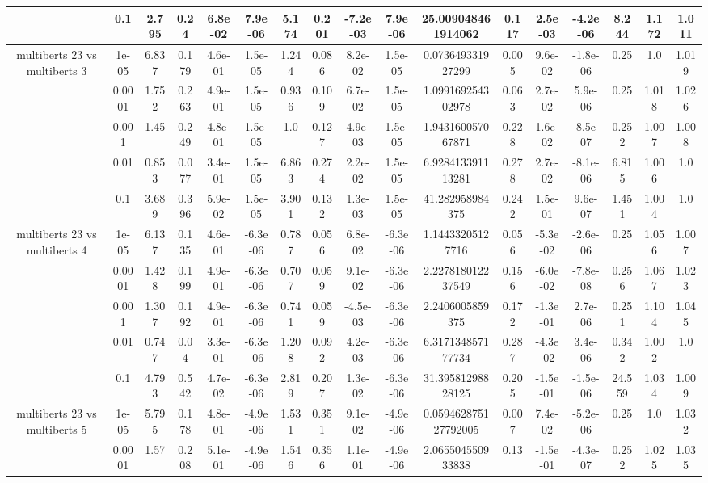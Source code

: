 \begin{tabular}{|c|c|c|c|c|c|c|c|c|c|c|c|c|c|c|c|c|}
 & 0.1 & 2.795 & 0.24 & 6.8e-02 & 7.9e-06 & 5.174 & 0.201 & -7.2e-03 & 7.9e-06 & 25.009048461914062 & 0.117 & 2.5e-03 & -4.2e-06 & 8.244 & 1.172 & 1.011 \\
\hline
\multirow{5}{*}{multiberts 23 vs multiberts 3} & 1e-05 & 6.837 & 0.179 & 4.6e-01 & 1.5e-05 & 1.244 & 0.086 & 8.2e-02 & 1.5e-05 & 0.073649331927299 & 0.005 & 9.6e-02 & -1.8e-06 & 0.25 & 1.0 & 1.019 \\
 & 0.0001 & 1.752 & 0.263 & 4.9e-01 & 1.5e-05 & 0.936 & 0.109 & 6.7e-02 & 1.5e-05 & 1.099169254302978 & 0.063 & 2.7e-02 & 5.9e-06 & 0.25 & 1.018 & 1.026 \\
 & 0.001 & 1.45 & 0.249 & 4.8e-01 & 1.5e-05 & 1.0 & 0.127 & 4.9e-03 & 1.5e-05 & 1.943160057067871 & 0.228 & 1.6e-02 & -8.5e-07 & 0.252 & 1.007 & 1.008 \\
 & 0.01 & 0.853 & 0.077 & 3.4e-01 & 1.5e-05 & 6.863 & 0.274 & 2.2e-02 & 1.5e-05 & 6.928413391113281 & 0.278 & 2.7e-02 & -8.1e-06 & 6.815 & 1.006 & 1.0 \\
 & 0.1 & 3.689 & 0.396 & 5.9e-02 & 1.5e-05 & 3.901 & 0.132 & 1.3e-03 & 1.5e-05 & 41.282958984375 & 0.242 & 1.5e-01 & 9.6e-07 & 1.451 & 1.004 & 1.0 \\
\hline
\multirow{5}{*}{multiberts 23 vs multiberts 4} & 1e-05 & 6.137 & 0.135 & 4.6e-01 & -6.3e-06 & 0.787 & 0.056 & 6.8e-02 & -6.3e-06 & 1.14433205127716 & 0.056 & -5.3e-02 & -2.6e-06 & 0.25 & 1.056 & 1.007 \\
 & 0.0001 & 1.428 & 0.199 & 4.9e-01 & -6.3e-06 & 0.707 & 0.059 & 9.1e-02 & -6.3e-06 & 2.227818012237549 & 0.156 & -6.0e-02 & -7.8e-08 & 0.256 & 1.067 & 1.023 \\
 & 0.001 & 1.307 & 0.192 & 4.9e-01 & -6.3e-06 & 0.741 & 0.059 & -4.5e-03 & -6.3e-06 & 2.2406005859375 & 0.172 & -1.3e-01 & 2.7e-06 & 0.251 & 1.104 & 1.045 \\
 & 0.01 & 0.747 & 0.04 & 3.3e-01 & -6.3e-06 & 1.208 & 0.092 & 4.2e-03 & -6.3e-06 & 6.317134857177734 & 0.287 & -4.3e-02 & 3.4e-06 & 0.342 & 1.002 & 1.0 \\
 & 0.1 & 4.793 & 0.542 & 4.7e-02 & -6.3e-06 & 2.819 & 0.207 & 1.3e-02 & -6.3e-06 & 31.39581298828125 & 0.205 & -1.5e-01 & -1.5e-06 & 24.559 & 1.034 & 1.009 \\
\hline
\multirow{5}{*}{multiberts 23 vs multiberts 5} & 1e-05 & 5.795 & 0.178 & 4.8e-01 & -4.9e-06 & 1.531 & 0.351 & 9.1e-02 & -4.9e-06 & 0.059462875127792005 & 0.007 & 7.4e-02 & -5.2e-06 & 0.25 & 1.0 & 1.032 \\
 & 0.0001 & 1.57 & 0.208 & 5.1e-01 & -4.9e-06 & 1.546 & 0.356 & 1.1e-01 & -4.9e-06 & 2.065504550933838 & 0.13 & -1.5e-01 & -4.3e-07 & 0.252 & 1.025 & 1.035 \\

\end{tabular}
